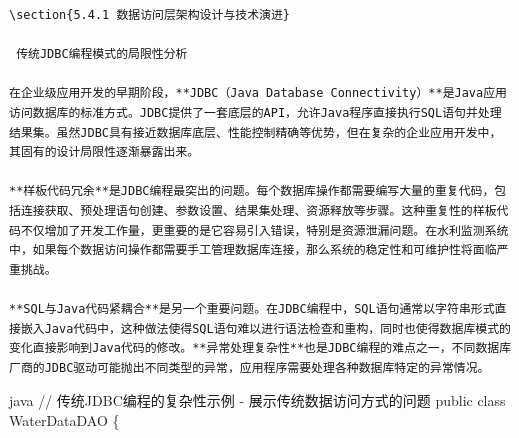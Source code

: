 \begin{lstlisting}
\section{5.4.1 数据访问层架构设计与技术演进}

 传统JDBC编程模式的局限性分析

在企业级应用开发的早期阶段，**JDBC（Java Database Connectivity）**是Java应用访问数据库的标准方式。JDBC提供了一套底层的API，允许Java程序直接执行SQL语句并处理结果集。虽然JDBC具有接近数据库底层、性能控制精确等优势，但在复杂的企业应用开发中，其固有的设计局限性逐渐暴露出来。

**样板代码冗余**是JDBC编程最突出的问题。每个数据库操作都需要编写大量的重复代码，包括连接获取、预处理语句创建、参数设置、结果集处理、资源释放等步骤。这种重复性的样板代码不仅增加了开发工作量，更重要的是它容易引入错误，特别是资源泄漏问题。在水利监测系统中，如果每个数据访问操作都需要手工管理数据库连接，那么系统的稳定性和可维护性将面临严重挑战。

**SQL与Java代码紧耦合**是另一个重要问题。在JDBC编程中，SQL语句通常以字符串形式直接嵌入Java代码中，这种做法使得SQL语句难以进行语法检查和重构，同时也使得数据库模式的变化直接影响到Java代码的修改。**异常处理复杂性**也是JDBC编程的难点之一，不同数据库厂商的JDBC驱动可能抛出不同类型的异常，应用程序需要处理各种数据库特定的异常情况。
\end{lstlisting}

java // 传统JDBC编程的复杂性示例 - 展示传统数据访问方式的问题 public class WaterDataDAO \{

